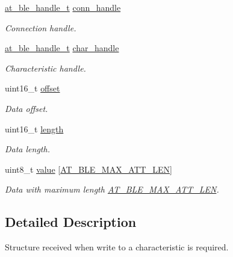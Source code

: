 \begin{DoxyCompactItemize}
\item 
\mbox{\hyperlink{at__ble__api_8h_abd23646d0c662860741f787efc8456f2}{at\+\_\+ble\+\_\+handle\+\_\+t}} \mbox{\hyperlink{structat__ble__characteristic__write__request__t_ae42df6fd8493f8f8faeccfdd6062e96f}{conn\+\_\+handle}}
\begin{DoxyCompactList}\small\item\em Connection handle. \end{DoxyCompactList}\item 
\mbox{\hyperlink{at__ble__api_8h_abd23646d0c662860741f787efc8456f2}{at\+\_\+ble\+\_\+handle\+\_\+t}} \mbox{\hyperlink{structat__ble__characteristic__write__request__t_abf2dd98b1df5d9471f3e18780eb5e5a7}{char\+\_\+handle}}
\begin{DoxyCompactList}\small\item\em Characteristic handle. \end{DoxyCompactList}\item 
uint16\+\_\+t \mbox{\hyperlink{structat__ble__characteristic__write__request__t_ac681806181c80437cfab37335f62ff39}{offset}}
\begin{DoxyCompactList}\small\item\em Data offset. \end{DoxyCompactList}\item 
uint16\+\_\+t \mbox{\hyperlink{structat__ble__characteristic__write__request__t_a1892eba2086d12ac2b09005aeb09ea3b}{length}}
\begin{DoxyCompactList}\small\item\em Data length. \end{DoxyCompactList}\item 
uint8\+\_\+t \mbox{\hyperlink{structat__ble__characteristic__write__request__t_ad96d1daae71cc8407c9c2079f8e8bf47}{value}} \mbox{[}\mbox{\hyperlink{at__ble__api_8h_aef91d9f37b950f3551cde0f9f5b01c50}{A\+T\+\_\+\+B\+L\+E\+\_\+\+M\+A\+X\+\_\+\+A\+T\+T\+\_\+\+L\+EN}}\mbox{]}
\begin{DoxyCompactList}\small\item\em Data with maximum length \mbox{\hyperlink{at__ble__api_8h_aef91d9f37b950f3551cde0f9f5b01c50}{A\+T\+\_\+\+B\+L\+E\+\_\+\+M\+A\+X\+\_\+\+A\+T\+T\+\_\+\+L\+EN}}. \end{DoxyCompactList}\end{DoxyCompactItemize}


\subsection{Detailed Description}
Structure received when write to a characteristic is required. 

